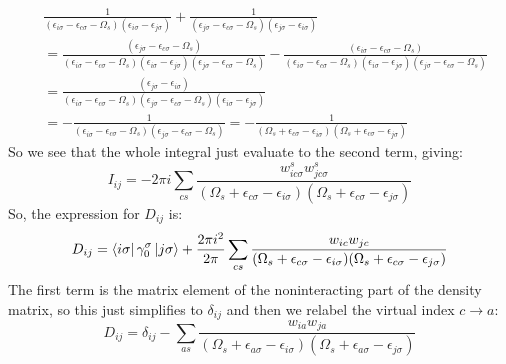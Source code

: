 \documentclass[12pt]{article}
\begin{document}
\begin{equation}
\begin{aligned}
& \frac{1}{(\epsilon_{i \sigma} - \epsilon_{c \sigma} - \Omega_s)(\epsilon_{i \sigma} - \epsilon_{j \sigma})} + \frac{1}{(\epsilon_{j \sigma} - \epsilon_{c \sigma} - \Omega_s)(\epsilon_{j \sigma} - \epsilon_{i \sigma})} \\
& = \frac{\left( \epsilon_{j\sigma } - \epsilon_{c\sigma } - \Omega _s \right)}{\left(\epsilon_{i\sigma } - \epsilon_{c\sigma } - \Omega _s\right)\left(\epsilon_{i\sigma } - \epsilon_{j\sigma }\right)\left(\epsilon_{j\sigma } - \epsilon_{c\sigma } - \Omega _s\right)} - \frac{\left( \epsilon_{i\sigma } - \epsilon_{c\sigma } - \Omega _s \right)}{\left(\epsilon_{i\sigma } - \epsilon_{c\sigma } - \Omega _s\right)\left(\epsilon_{i\sigma } - \epsilon_{j\sigma }\right)\left(\epsilon_{j\sigma } - \epsilon_{c\sigma } - \Omega _s\right)}\\
&=\frac{\left( \epsilon _{j\sigma } - \epsilon _{i\sigma } \right)}{\left(\epsilon _{i\sigma } - \epsilon _{c\sigma } - \Omega _s\right)\left(\epsilon _{j\sigma } - \epsilon _{c\sigma } - \Omega _s\right)\left(\epsilon _{i\sigma } - \epsilon _{j\sigma }\right)}\\
&= -\frac{1}{\left(\epsilon _{i\sigma } - \epsilon _{c\sigma } - \Omega _s\right)\left(\epsilon _{j\sigma } - \epsilon _{c\sigma } - \Omega _s\right)}=-\frac{1}{\left(\Omega _s + \epsilon _{c\sigma } - \epsilon _{i\sigma }\right)\left(\Omega _s + \epsilon _{c\sigma } - \epsilon _{j\sigma }\right)}
\end{aligned}
\end{equation}
So we see that the whole integral just evaluate to the second term, giving:
\begin{equation}
I_{ij} = -2\pi i \sum_{cs}\frac{w_{i c \sigma}^s w_{j c \sigma}^s}{(\Omega_s + \epsilon_{c \sigma} - \epsilon_{i \sigma})(\Omega_s + \epsilon_{c \sigma} - \epsilon_{j \sigma})}
\end{equation}
So, the expression for $D_{ij}$ is:
\begin{equation}
D_{ij} = \bra{i\sigma } \gamma _0^\sigma \ket{j\sigma } + \frac{2\pi i^2}{2\pi} \sum_{cs}\frac{w_{ic} w_{jc}}{(\Omega_s + \epsilon_{c \sigma} - \epsilon_{i \sigma})(\Omega_s + \epsilon_{c \sigma} - \epsilon_{j \sigma})}
\end{equation}
The first term is the matrix element of the noninteracting part of the density matrix, so this just simplifies to $\delta _{ij}$ and then we relabel the virtual index $c\rightarrow a$:
\begin{equation}
D_{ij} = \delta _{ij} - \sum_{as}\frac{w_{ia} w_{ja}}{(\Omega_s + \epsilon_{a \sigma} - \epsilon_{i \sigma})(\Omega_s + \epsilon_{a \sigma} - \epsilon_{j \sigma})}
\end{equation}
\end{document}
